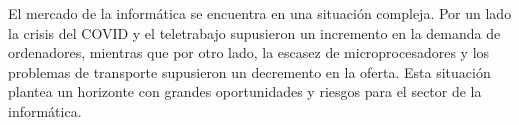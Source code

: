 El mercado de la informática se encuentra en una situación compleja. Por un lado la crisis del COVID y el teletrabajo supusieron un incremento en la demanda de ordenadores, mientras que por otro lado, la escasez de microprocesadores y los problemas de transporte supusieron un decremento en la oferta. Esta situación plantea un horizonte con grandes oportunidades y riesgos para el sector de la informática.

